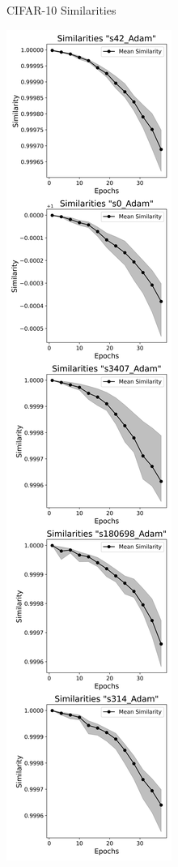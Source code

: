 \begin{figure}[h!]
\begin{subfigure}[b]{0.3\textwidth}
        \caption{CIFAR-10 Similarities}
        \label{fig:cifar10_adam}
      \end{subfigure}
      \hfill %
      \begin{subfigure}[b]{0.3\textwidth}
        \includegraphics[width=\textwidth]{figures/mammo_similarities_Adam_V2.png}

\end{subfigure}
\end{figure}
